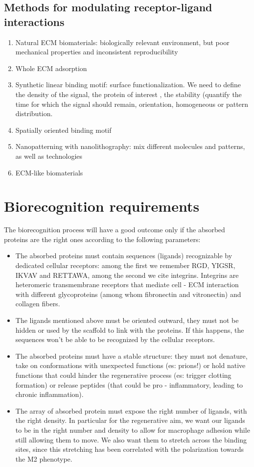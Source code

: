 \subsection{Methods for modulating receptor-ligand interactions}
\begin{enumerate}
\item Natural ECM biomaterials: biologically relevant environment, but poor mechanical properties and inconsistent reproducibility
\item Whole ECM adsorption
\item Synthetic linear binding motif: surface functionalization. We need to define the density of the signal, the protein of interest , the stability (quantify the time for which the signal should remain, orientation, homogeneous or pattern distribution.
\item Spatially oriented binding motif
\item Nanopatterning with nanolithography: mix different molecules and patterns, as well as technologies
\item ECM-like biomaterials
\end{enumerate}

\section{Biorecognition requirements}
The biorecognition process will have a good outcome only if the absorbed proteins are the right ones according to the following parameters:
\begin{itemize}
\item The absorbed proteins must contain sequences (ligands) recognizable by dedicated cellular receptors: among the first we remember RGD, YIGSR, IKVAV and RETTAWA, among the second we cite integrins. 
Integrins are heteromeric transmembrane receptors that mediate cell - ECM interaction with different glycoproteins (among whom fibronectin and vitronectin) and collagen fibers.
\item The ligands mentioned above must be oriented outward, they must not be hidden or used by the scaffold to link with the proteins. If this happens, the sequences won’t be able to be recognized by the cellular receptors.
\item The absorbed proteins must have a stable structure: they must not denature, take on conformations with unexpected functions (es: prions!) or hold native functions that could hinder the regenerative process (es: trigger clotting formation) or release peptides (that could be pro - inflammatory, leading to chronic inflammation).
\item The array of absorbed protein must expose the right number of ligands, with the right density.  In particular for the regenerative aim, we want our ligands to be in the right number and density to allow for macrophage adhesion while still allowing them to move. We also want them to stretch across the binding sites, since this stretching has been correlated with the polarization towards the M2 phenotype.
\end{itemize}




